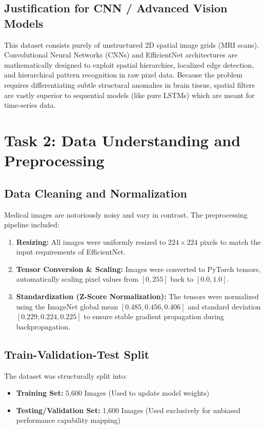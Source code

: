 \documentclass[12pt, a4paper]{article}
\begin{document}
\subsection*{Justification for CNN / Advanced Vision Models}
This dataset consists purely of unstructured 2D spatial image grids (MRI scans). Convolutional Neural Networks (CNNs) and EfficientNet architectures are mathematically designed to exploit spatial hierarchies, localized edge detection, and hierarchical pattern recognition in raw pixel data. Because the problem requires differentiating subtle structural anomalies in brain tissue, spatial filters are vastly superior to sequential models (like pure LSTMs) which are meant for time-series data. 


\section*{Task 2: Data Understanding and Preprocessing}

\subsection*{Data Cleaning and Normalization}
Medical images are notoriously noisy and vary in contrast. The preprocessing pipeline included:
\begin{enumerate}
    \item \textbf{Resizing:} All images were uniformly resized to $224 \times 224$ pixels to match the input requirements of EfficientNet.
    \item \textbf{Tensor Conversion \& Scaling:} Images were converted to PyTorch tensors, automatically scaling pixel values from $[0, 255]$ back to $[0.0, 1.0]$.
    \item \textbf{Standardization (Z-Score Normalization):} The tensors were normalized using the ImageNet global mean $[0.485, 0.456, 0.406]$ and standard deviation $[0.229, 0.224, 0.225]$ to ensure stable gradient propagation during backpropagation.
\end{enumerate}

\subsection*{Train-Validation-Test Split}
The dataset was structurally split into:
\begin{itemize}
    \item \textbf{Training Set:} 5,600 Images (Used to update model weights)
    \item \textbf{Testing/Validation Set:} 1,600 Images (Used exclusively for unbiased performance capability mapping)
\end{itemize}
\end{document}
